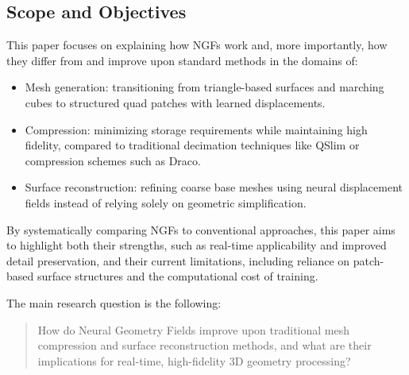 \subsection{Scope and Objectives}

This paper focuses on explaining how NGFs work and, more importantly, how they differ from and improve upon standard methods in the domains of:
\begin{itemize}
    \item Mesh generation: transitioning from triangle-based surfaces and marching cubes to structured quad patches with learned displacements.
    \item Compression: minimizing storage requirements while maintaining high fidelity, compared to traditional decimation techniques like QSlim or compression schemes such as Draco.
    \item Surface reconstruction: refining coarse base meshes using neural displacement fields instead of relying solely on geometric simplification.
\end{itemize}

By systematically comparing NGFs to conventional approaches, this paper aims to highlight both their strengths, such as real-time applicability and improved detail preservation, and their current limitations, including reliance on patch-based surface structures and the computational cost of training.

The main research question is the following:

\begin{quote}
How do Neural Geometry Fields improve upon traditional mesh compression and surface reconstruction methods, and what are their implications for real-time, high-fidelity 3D geometry processing?
\end{quote}